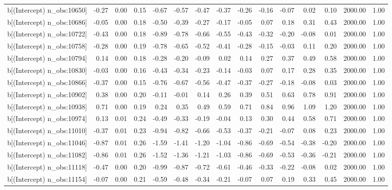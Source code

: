 \begin{table}[ht]
\begin{tabular}{rrrrrrrrrrrrrrr}
  b[(Intercept) n\_obs:10650] & -0.27 & 0.00 & 0.15 & -0.67 & -0.57 & -0.47 & -0.37 & -0.26 & -0.16 & -0.07 & 0.02 & 0.10 & 2000.00 & 1.00 \\ 
  b[(Intercept) n\_obs:10686] & -0.05 & 0.00 & 0.18 & -0.50 & -0.39 & -0.27 & -0.17 & -0.05 & 0.07 & 0.18 & 0.31 & 0.43 & 2000.00 & 1.00 \\ 
  b[(Intercept) n\_obs:10722] & -0.43 & 0.00 & 0.18 & -0.89 & -0.78 & -0.66 & -0.55 & -0.43 & -0.32 & -0.20 & -0.08 & 0.01 & 2000.00 & 1.00 \\ 
  b[(Intercept) n\_obs:10758] & -0.28 & 0.00 & 0.19 & -0.78 & -0.65 & -0.52 & -0.41 & -0.28 & -0.15 & -0.03 & 0.11 & 0.20 & 2000.00 & 1.00 \\ 
  b[(Intercept) n\_obs:10794] & 0.14 & 0.00 & 0.18 & -0.28 & -0.20 & -0.09 & 0.02 & 0.14 & 0.27 & 0.37 & 0.49 & 0.58 & 2000.00 & 1.00 \\ 
  b[(Intercept) n\_obs:10830] & -0.03 & 0.00 & 0.16 & -0.43 & -0.34 & -0.23 & -0.14 & -0.03 & 0.07 & 0.17 & 0.28 & 0.35 & 2000.00 & 1.00 \\ 
  b[(Intercept) n\_obs:10866] & -0.37 & 0.00 & 0.15 & -0.76 & -0.67 & -0.56 & -0.47 & -0.37 & -0.27 & -0.18 & -0.08 & 0.03 & 2000.00 & 1.00 \\ 
  b[(Intercept) n\_obs:10902] & 0.38 & 0.00 & 0.20 & -0.11 & -0.01 & 0.14 & 0.26 & 0.39 & 0.51 & 0.63 & 0.78 & 0.91 & 2000.00 & 1.00 \\ 
  b[(Intercept) n\_obs:10938] & 0.71 & 0.00 & 0.19 & 0.24 & 0.35 & 0.49 & 0.59 & 0.71 & 0.84 & 0.96 & 1.09 & 1.20 & 2000.00 & 1.00 \\ 
  b[(Intercept) n\_obs:10974] & 0.13 & 0.01 & 0.24 & -0.49 & -0.33 & -0.19 & -0.04 & 0.13 & 0.30 & 0.44 & 0.58 & 0.71 & 2000.00 & 1.00 \\ 
  b[(Intercept) n\_obs:11010] & -0.37 & 0.01 & 0.23 & -0.94 & -0.82 & -0.66 & -0.53 & -0.37 & -0.21 & -0.07 & 0.08 & 0.23 & 2000.00 & 1.00 \\ 
  b[(Intercept) n\_obs:11046] & -0.87 & 0.01 & 0.26 & -1.59 & -1.41 & -1.20 & -1.04 & -0.86 & -0.69 & -0.54 & -0.38 & -0.20 & 2000.00 & 1.00 \\ 
  b[(Intercept) n\_obs:11082] & -0.86 & 0.01 & 0.26 & -1.52 & -1.36 & -1.21 & -1.03 & -0.86 & -0.69 & -0.53 & -0.36 & -0.21 & 2000.00 & 1.00 \\ 
  b[(Intercept) n\_obs:11118] & -0.47 & 0.00 & 0.20 & -0.99 & -0.87 & -0.72 & -0.61 & -0.46 & -0.33 & -0.22 & -0.08 & 0.02 & 2000.00 & 1.00 \\ 
  b[(Intercept) n\_obs:11154] & -0.07 & 0.00 & 0.21 & -0.59 & -0.48 & -0.34 & -0.21 & -0.07 & 0.07 & 0.19 & 0.33 & 0.45 & 2000.00 & 1.00 \\ 

\end{tabular}
\end{table}
